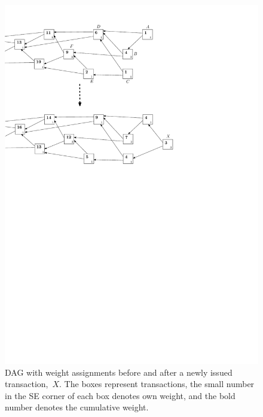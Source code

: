 \documentclass[12pt]{article}
\begin{document}
\begin{figure}
 \centering \includegraphics{weights} 
\caption{DAG with weight assignments before and after
a newly issued transaction,~$X$. The boxes represent transactions,
the small number in the SE corner of each box denotes own weight, and the 
bold number denotes the cumulative weight.
}
\label{f_weights}
\end{figure}
\end{document}
